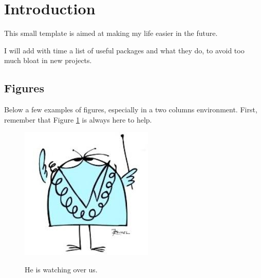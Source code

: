 \section{Introduction}
    This small template is aimed at making my life easier in the future.

    I will add with time a list of useful packages and what they do, to avoid too much bloat in new projects.

    \subsection{Figures}
        Below a few examples of figures, especially in a two columns environment.
        First, remember that Figure \ref{fig:intro:shadoko} is always here to help.

        \begin{figure}[h]
            \centering
            \includegraphics[width=0.8\columnwidth]{figure/intro/shadoko}
            \label{fig:intro:shadoko}
            \caption{He is watching over us.\cite{denis2012de}}
        \end{figure}


